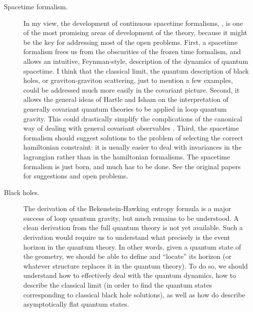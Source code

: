 \documentclass[12pt]{article}
\begin{document}
\begin{description}
\item[Spacetime formalism.]

 In my view, the development of continuous spacetime formalisms, 
 \cite{RovelliSurf,ReisenbergerRovelli,Baez97,SmolinMarkopoulo}, 
 is one of the most promising areas of development of the theory, 
 because it might be the key for addressing most of the open 
 problems.  First, a spacetime formalism frees us from the 
 obscurities of the frozen time formalism, and allows an 
 intuitive, Feynman-style, description of the dynamics of quantum 
 spacetime.  I think that the classical limit, the quantum 
 description of black holes, or graviton-graviton scattering, just 
 to mention a few examples, could be addressed much more easily in 
 the covariant picture.  Second, it allows the general ideas of 
 Hartle \cite{Hartle} and Isham \cite{Isham,Isham2,Isham3,Isham4} 
 on the interpretation of generally covariant quantum theories to 
 be applied in loop quantum gravity.  This could drastically 
 simplify the complications of the canonical way of dealing with 
 general covariant observables 
 \cite{RovelliObservables,RovelliObservables2}.  Third, the 
 spacetime formalism should suggest solutions to the problem of 
 selecting the correct hamiltonian constraint: it is usually 
 easier to deal with invariances in the lagrangian rather than in 
 the hamiltonian formalisms.  The spacetime formalism is just 
 born, and much has to be done.  See the original papers for 
 suggestions and open problems.

\item[Black holes.]

The derivation of the Bekenstein-Hawking entropy formula 
is a major success of loop quantum gravity, but much 
remains to be understood.   A clean derivation from the 
full quantum theory is not yet available.  Such a 
derivation would require us to understand what precisely 
is the event horizon in the quantum theory.  In other 
words, given a quantum state of the geometry, we should be 
able to define and ``locate'' its horizon (or whatever 
structure replaces it in the quantum theory).  To do so, 
we should understand how to effectively deal with the 
quantum dynamics, how to describe the classical limit (in 
order to find the quantum states corresponding to 
classical black hole solutions), as well as how do describe 
asymptotically flat quantum states.  


\end{description}
\end{document}
